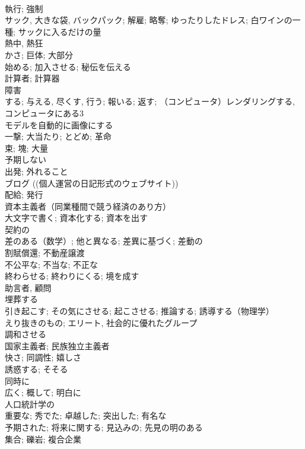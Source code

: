 \documentclass[8pt]{extreport}
\begin{document}
\begin{CJK}{UTF8}{min}
\\	執行; 強制	
\\	サック, 大きな袋, バックパック; 解雇; 略奪; ゆったりしたドレス; 白ワインの一種; サックに入るだけの量	
\\	熱中, 熱狂	
\\	かさ; 巨体; 大部分	
\\	始める; 加入させる; 秘伝を伝える	
\\	計算者; 計算器	
\\	障害	
\\	する; 与える, 尽くす, 行う; 報いる; 返す; （コンピュータ）レンダリングする, コンピュータにある3
\\	モデルを自動的に画像にする	
\\	一撃; 大当たり; とどめ; 革命	
\\	束; 塊; 大量	
\\	予期しない	
\\	出発; 外れること	
\\	ブログ ((個人運営の日記形式のウェブサイト))	
\\	配給; 発行	
\\	資本主義者（同業種間で競う経済のあり方）	
\\	大文字で書く; 資本化する; 資本を出す	
\\	契約の	
\\	差のある（数学）; 他と異なる; 差異に基づく; 差動の	
\\	割賦償還; 不動産譲渡	
\\	不公平な; 不当な; 不正な	
\\	終わらせる; 終わりにくる; 境を成す	
\\	助言者, 顧問	
\\	埋葬する	
\\	引き起こす; その気にさせる; 起こさせる; 推論する; 誘導する（物理学）	
\\	えり抜きのもの; エリート, 社会的に優れたグループ	
\\	調和させる	
\\	国家主義者; 民族独立主義者	
\\	快さ; 同調性; 嬉しさ	
\\	誘惑する; そそる	
\\	同時に	
\\	広く; 概して; 明白に	
\\	人口統計学の	
\\	重要な; 秀でた; 卓越した; 突出した; 有名な	
\\	予期された; 将来に関する; 見込みの; 先見の明のある	
\\	集合; 礫岩; 複合企業	

\end{CJK}
\end{document}
